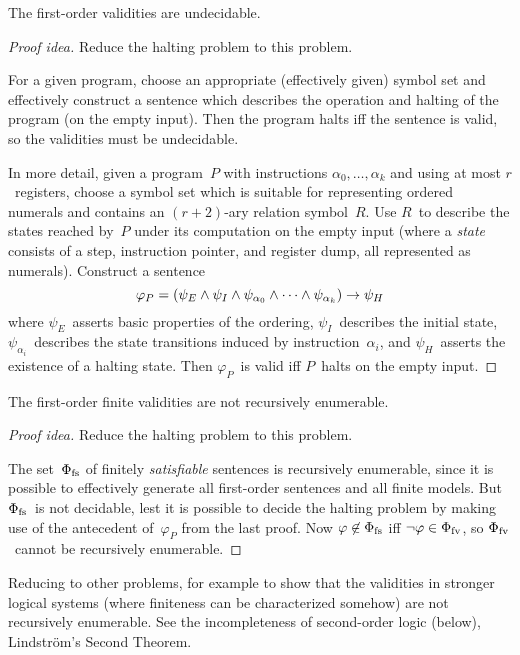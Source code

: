 \begin{thm}
The first-order validities are undecidable.
\end{thm}
\begin{proof}[Proof idea]
Reduce the halting problem to this problem.

For a given program, choose an appropriate (effectively given) symbol set and effectively construct a sentence which describes the operation and halting of the program (on the empty input). Then the program halts iff the sentence is valid, so the validities must be undecidable.

In more detail, given a program~\(P\) with instructions \(\alpha_0,\ldots,\alpha_k\) and using at most \(r\)~registers, choose a symbol set which is suitable for representing ordered numerals and contains an \((r+2)\)-ary relation symbol~\(R\). Use \(R\)~to describe the states reached by~\(P\) under its computation on the empty input (where a \emph{state} consists of a step, instruction pointer, and register dump, all represented as numerals). Construct a sentence
\[\varphi_P=(\psi_E\land\psi_I\land\psi_{\alpha_0}\land\cdots\land\psi_{\alpha_k})\rightarrow\psi_H\]
where \(\psi_E\)~asserts basic properties of the ordering, \(\psi_I\)~describes the initial state, \(\psi_{\alpha_i}\)~describes the state transitions induced by instruction~\(\alpha_i\), and \(\psi_H\)~asserts the existence of a halting state. Then \(\varphi_P\)~is valid iff \(P\)~halts on the empty input.
\end{proof}

\begin{thm}[Trahtenbrot]
The first-order finite validities are not recursively enumerable.
\end{thm}
\begin{proof}[Proof idea]
Reduce the halting problem to this problem.

The set~\(\Phi_{\mathrm{fs}}\) of finitely \emph{satisfiable} sentences is recursively enumerable, since it is possible to effectively generate all first-order sentences and all finite models. But \(\Phi_{\mathrm{fs}}\)~is not decidable, lest it is possible to decide the halting problem by making use of the antecedent of~\(\varphi_P\) from the last proof. Now \(\varphi\not\in\Phi_{\mathrm{fs}}\) iff \(\lnot\varphi\in\Phi_{\mathrm{fv}}\), so \(\Phi_{\mathrm{fv}}\)~cannot be recursively enumerable.
\end{proof}
\begin{app}
Reducing to other problems, for example to show that the validities in stronger logical systems (where finiteness can be characterized somehow) are not recursively enumerable. See the incompleteness of second-order logic (below), Lindstr\"om's Second Theorem.
\end{app}


